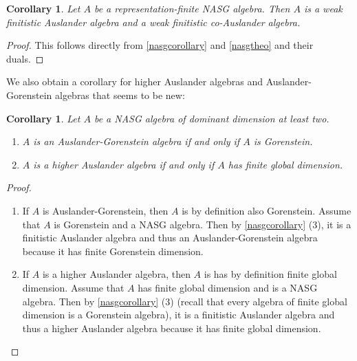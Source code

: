 \documentclass[a4paper]{amsart}
\newtheorem{corollary}[theorem]{Corollary}
\theoremstyle{definition}
\theoremstyle{remark}
\numberwithin{equation}{theorem}
\begin{document}
\begin{corollary}
Let $A$ be a representation-finite NASG algebra. Then $A$ is a weak finitistic Auslander algebra and a weak finitistic co-Auslander algebra.
\end{corollary}
\begin{proof}
This follows directly from \ref{nasgcorollary} and \ref{nasgtheo} and their duals.
\end{proof}



We also obtain a corollary for higher Auslander algebras and Auslander-Gorenstein algebras that seems to be new:
\begin{corollary}
Let $A$ be a NASG algebra of dominant dimension at least two.
\begin{enumerate}
\item $A$ is an Auslander-Gorenstein algebra if and only if $A$ is Gorenstein.
\item $A$ is a higher Auslander algebra if and only if $A$ has finite global dimension.
\end{enumerate}

\end{corollary}

\begin{proof}
\begin{enumerate}
\item If $A$ is Auslander-Gorenstein, then $A$ is by definition also Gorenstein.
Assume that $A$ is Gorenstein and a NASG algebra. Then by \ref{nasgcorollary} (3), it is a finitistic Auslander algebra and thus an Auslander-Gorenstein algebra because it has finite Gorenstein dimension.
\item If $A$ is a higher Auslander algebra, then $A$ is has by definition finite global dimension.
Assume that $A$ has finite global dimension and is a NASG algebra. Then by \ref{nasgcorollary} (3) (recall that every algebra of finite global dimension is a Gorenstein algebra), it is a finitistic Auslander algebra and thus a higher Auslander algebra because it has finite global dimension.
\end{enumerate}
\end{proof}
\end{document}
